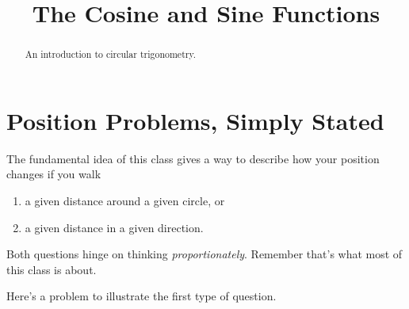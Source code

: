 \documentclass{ximera}
\title{The Cosine and Sine Functions}
\begin{document}
\begin{abstract}
An introduction to circular trigonometry.
\end{abstract}
\maketitle


\section{Position Problems, Simply Stated}

The fundamental idea of this class gives a way to describe how your position changes if you walk

\begin{enumerate}
\item a given distance around a given circle, or

\item a given distance in a given direction. 
\end{enumerate}

Both questions hinge on thinking \emph{proportionately}. Remember that's what most of this class is about.
 
Here's a problem to illustrate the first type of question.
\end{document}
